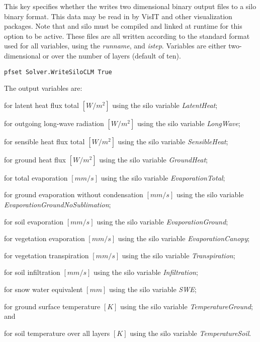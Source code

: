 {This key specifies whether the  writes two dimensional binary output files to a silo binary format. This data may be read in by VisIT and other visualization packages.  Note that  and silo must be compiled and linked at runtime for this option to be active. These files are all written according to the standard format used for all \parflow{} variables, using the {\em runname}, and {\em istep}.  Variables are either two-dimensional or over the number of  layers (default of ten). 
}
\begin{display}\begin{verbatim}
pfset Solver.WriteSiloCLM True
\end{verbatim}\end{display}
The output variables are:
\begin{description}
\item {} for latent heat flux total $[W/m^2]$ using the silo variable {\em LatentHeat};
\item {} for outgoing long-wave radiation $[W/m^2]$ using the silo variable {\em LongWave};
\item {} for sensible heat flux total $[W/m^2]$ using the silo variable {\em SensibleHeat};
\item {} for ground heat flux $[W/m^2]$ using the silo variable {\em GroundHeat};
\item {} for total evaporation $[mm/s]$ using the silo variable {\em EvaporationTotal}; 
\item {} for ground evaporation without condensation $[mm/s]$ using the silo variable {\em EvaporationGroundNoSublimation};
\item {} for soil evaporation $[mm/s]$ using the silo variable {\em EvaporationGround};
\item {} for vegetation evaporation $[mm/s]$ using the silo variable {\em EvaporationCanopy};
\item {} for vegetation transpiration $[mm/s]$ using the silo variable {\em Transpiration}; 
\item {} for soil infiltration $[mm/s]$ using the silo variable {\em Infiltration};
\item {} for snow water equivalent $[mm]$ using the silo variable {\em SWE};
\item {} for ground surface temperature $[K]$ using the silo variable {\em TemperatureGround}; and 
\item {} for soil temperature over all layers $[K]$ using the silo variable {\em TemperatureSoil}.
\end{description}

